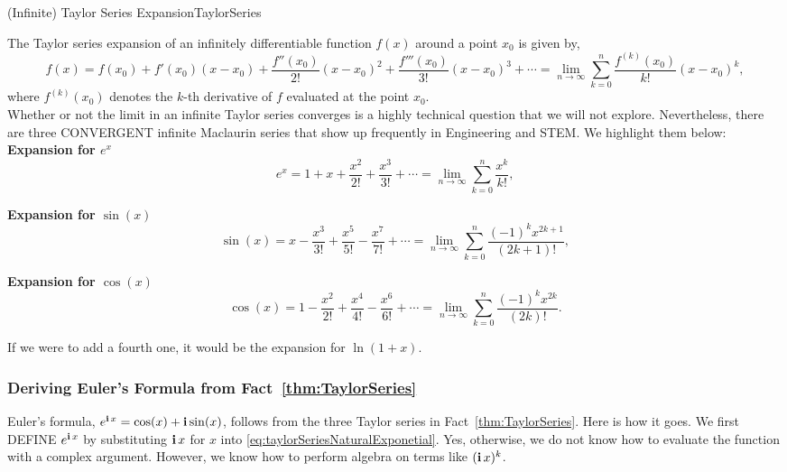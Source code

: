 \begin{factColor}{(Infinite) Taylor Series Expansion}{TaylorSeries}

The Taylor series expansion of an infinitely differentiable function $f(x)$ around a point $x_0$ is given by,
\begin{equation}
    f(x) = f(x_0) + f'(x_0)(x-x_0) + \frac{f''(x_0)}{2!}(x-x_0)^2 + \frac{f'''(x_0)}{3!}(x-x_0)^3 + \cdots = \lim_{n \to \infty} \sum_{k=0}^{n} \frac{f^{(k)}(x_0)}{k!}(x-x_0)^k,
\end{equation}
where $f^{(k)}(x_0)$ denotes the $k$-th derivative of $f$ evaluated at the point $x_0$. \\

Whether or not the limit in an infinite Taylor series converges is a highly technical question that we will not explore. Nevertheless, there are three CONVERGENT infinite Maclaurin series that show up frequently in Engineering and STEM. We highlight them below:\\

\textbf{Expansion for $e^x$}
\begin{equation}
\label{eq:taylorSeriesNaturalExponetial}
    e^x = 1 + x + \frac{x^2}{2!} + \frac{x^3}{3!} + \cdots = \lim_{n \to \infty} \sum_{k=0}^{n}  \frac{x^k}{k!},
\end{equation}

\textbf{Expansion for $\sin(x)$}
\begin{equation}
    \sin(x) = x - \frac{x^3}{3!} + \frac{x^5}{5!} - \frac{x^7}{7!} + \cdots = \lim_{n \to \infty} \sum_{k=0}^{n}  \frac{(-1)^k x^{2k+1}}{(2k+1)!},
\end{equation}

\textbf{Expansion for $\cos(x)$}
\begin{equation}
    \cos(x) = 1 - \frac{x^2}{2!} + \frac{x^4}{4!} - \frac{x^6}{6!} + \cdots = \lim_{n \to \infty} \sum_{k=0}^{n}  \frac{(-1)^k x^{2k}}{(2k)!}.
\end{equation}

If we were to add a fourth one, it would be the expansion for $\ln(1 + x)$.
    
\end{factColor}

\subsubsection{Deriving Euler's Formula from Fact~\ref{thm:TaylorSeries}}

Euler's formula, $e^{\mathop{\bm{\mathrm i}} x} = \cos(x) + \mathop{\bm{\mathrm i}} \sin(x)$, follows from the three Taylor series in Fact~\ref{thm:TaylorSeries}. Here is how it goes. We first DEFINE $e^{\mathop{\bm{\mathrm i}} x}$ by substituting \(\mathop{\bm{\mathrm i}} x\) for \(x\) into \eqref{eq:taylorSeriesNaturalExponetial}. Yes, otherwise, we do not know how to evaluate the function with a complex argument. However, we know how to perform algebra on terms like $(\mathop{\bm{\mathrm i}} x)^k$. \\

